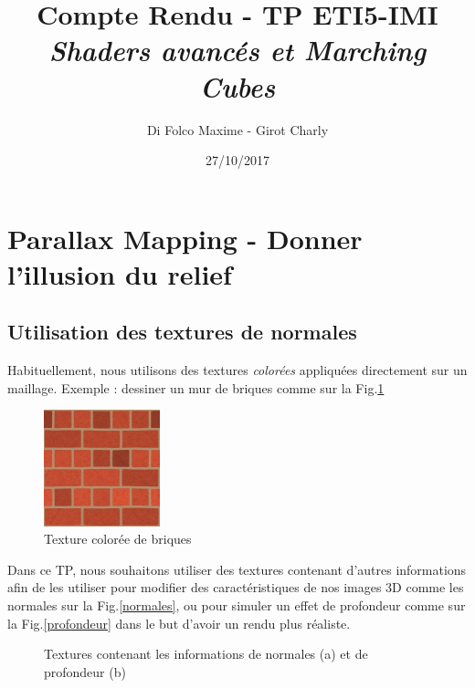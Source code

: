 \documentclass[a4paper]{article}
\title{Compte Rendu - TP ETI5-IMI \\ \textit{Shaders avancés et Marching Cubes}}
\author{Di Folco Maxime - Girot Charly}
\date{27/10/2017}
\begin{document}
\maketitle


\section{Parallax Mapping - Donner l'illusion du relief}
\subsection{Utilisation des textures de normales}
Habituellement, nous utilisons des textures \textit{colorées} appliquées directement sur un maillage. Exemple : dessiner un mur de briques comme sur la Fig.\ref{briques}

\begin{figure}[H]
\centering
\includegraphics[width=0.3\textwidth]{figures/brick_diffuse.png}
\caption{Texture colorée de briques}
\label{briques}
\end{figure}


Dans ce TP, nous souhaitons utiliser des textures contenant d'autres informations afin de les utiliser pour modifier des caractéristiques de nos images 3D comme les normales sur la Fig.\ref{normales}, ou pour simuler un effet de profondeur comme sur la Fig.\ref{profondeur} dans le but d'avoir un rendu plus réaliste.

\begin{figure}[H]
\centering
{}
\caption{Textures contenant les informations de normales (a) et de profondeur (b)}
\end{figure}
\end{document}
